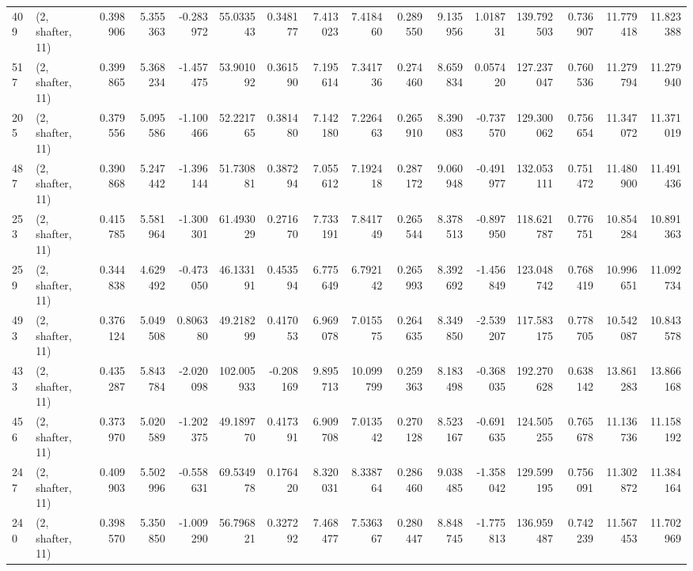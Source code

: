 \begin{tabular}{llrrrrrrrrrrrrrr}
409 &  (2, shafter, 11) &   0.398906 &   5.355363 &  -0.283972 &    55.033543 &   0.348177 &   7.413023 &   7.418460 &  0.289550 &   9.135956 &   1.018731 &   139.792503 &  0.736907 &  11.779418 &  11.823388 \\
517 &  (2, shafter, 11) &   0.399865 &   5.368234 &  -1.457475 &    53.901092 &   0.361590 &   7.195614 &   7.341736 &  0.274460 &   8.659834 &   0.057420 &   127.237047 &  0.760536 &  11.279794 &  11.279940 \\
205 &  (2, shafter, 11) &   0.379556 &   5.095586 &  -1.100466 &    52.221765 &   0.381480 &   7.142180 &   7.226463 &  0.265910 &   8.390083 &  -0.737570 &   129.300062 &  0.756654 &  11.347072 &  11.371019 \\
487 &  (2, shafter, 11) &   0.390868 &   5.247442 &  -1.396144 &    51.730881 &   0.387294 &   7.055612 &   7.192418 &  0.287172 &   9.060948 &  -0.491977 &   132.053111 &  0.751472 &  11.480900 &  11.491436 \\
253 &  (2, shafter, 11) &   0.415785 &   5.581964 &  -1.300301 &    61.493029 &   0.271670 &   7.733191 &   7.841749 &  0.265544 &   8.378513 &  -0.897950 &   118.621787 &  0.776751 &  10.854284 &  10.891363 \\
259 &  (2, shafter, 11) &   0.344838 &   4.629492 &  -0.473050 &    46.133191 &   0.453594 &   6.775649 &   6.792142 &  0.265993 &   8.392692 &  -1.456849 &   123.048742 &  0.768419 &  10.996651 &  11.092734 \\
493 &  (2, shafter, 11) &   0.376124 &   5.049508 &   0.806380 &    49.218299 &   0.417053 &   6.969078 &   7.015575 &  0.264635 &   8.349850 &  -2.539207 &   117.583175 &  0.778705 &  10.542087 &  10.843578 \\
433 &  (2, shafter, 11) &   0.435287 &   5.843784 &  -2.020098 &   102.005933 &  -0.208169 &   9.895713 &  10.099799 &  0.259363 &   8.183498 &  -0.368035 &   192.270628 &  0.638142 &  13.861283 &  13.866168 \\
456 &  (2, shafter, 11) &   0.373970 &   5.020589 &  -1.202375 &    49.189770 &   0.417391 &   6.909708 &   7.013542 &  0.270128 &   8.523167 &  -0.691635 &   124.505255 &  0.765678 &  11.136736 &  11.158192 \\
247 &  (2, shafter, 11) &   0.409903 &   5.502996 &  -0.558631 &    69.534978 &   0.176420 &   8.320031 &   8.338764 &  0.286460 &   9.038485 &  -1.358042 &   129.599195 &  0.756091 &  11.302872 &  11.384164 \\
240 &  (2, shafter, 11) &   0.398570 &   5.350850 &  -1.009290 &    56.796821 &   0.327292 &   7.468477 &   7.536367 &  0.280447 &   8.848745 &  -1.775813 &   136.959487 &  0.742239 &  11.567453 &  11.702969 \\

\end{tabular}
